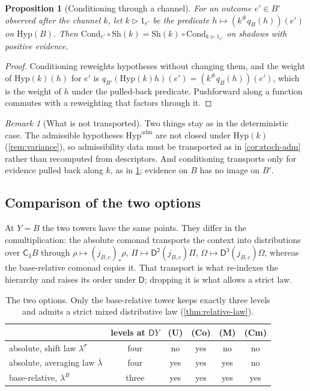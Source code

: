 \documentclass[11pt]{article}
\newtheorem{proposition}[theorem]{Proposition}
\theoremstyle{definition}
\theoremstyle{remark}
\newtheorem{remark}[theorem]{Remark}
\newcommand{\D}{\mathsf{D}}
\newcommand{\Hyp}{\mathrm{Hyp}}
\newcommand{\Sh}{\mathrm{Sh}}
\newcommand{\Cond}{\mathrm{Cond}}
\newcommand{\C}{\mathsf{C}}
\newcommand{\lb}{\bar\lambda}
\newcommand{\ls}{\lambda^{\sigma}}
\begin{document}
\begin{proposition}[Conditioning through a channel]\label{prop:stoch-cond}
For an outcome $e'\in B'$ observed after the channel $k$, let $k\rhd1_{e'}$ be the predicate
$h\mapsto (k^\#q_B(h))(e')$ on $\Hyp(B)$. Then
$\Cond_{e'}\circ\Sh(k)=\Sh(k)\circ\Cond_{k\rhd1_{e'}}$ on shadows with positive evidence.
\end{proposition}
\begin{proof}
Conditioning reweights hypotheses without changing them, and the weight of $\Hyp(k)(h)$ for $e'$ is
$q_{B'}(\Hyp(k)h)(e')=(k^\#q_B(h))(e')$, which is the weight of $h$ under the pulled-back predicate.
Pushforward along a function commutes with a reweighting that factors through it.
\end{proof}

\begin{remark}[What is not transported]
Two things stay as in the deterministic case. The admissible hypotheses $\Hyp^{\mathrm{adm}}$ are not
closed under $\Hyp(k)$ (\cref{rem:variance}), so admissibility data must be transported as in
\cref{cor:stoch-adm} rather than recomputed from descriptors. And conditioning transports only for
evidence pulled back along $k$, as in \cref{prop:stoch-cond}; evidence on $B$ has no image on $B'$.
\end{remark}

\subsection{Comparison of the two options}

At $Y=B$ the two towers have the same points. They differ in the comultiplication: the absolute
comonad transports the context into distributions over $\C_3B$ through
$\rho\mapsto(j_{B,c})_*\rho$, $\Pi\mapsto\D^2(j_{B,c})\Pi$, $\Omega\mapsto\D^3(j_{B,c})\Omega$, whereas the
base-relative comonad copies it. That transport is what re-indexes the hierarchy and raises its order
under $\D$; dropping it is what allows a strict law.

\begin{table}[h]
\centering
\begin{tabular}{@{}lccccc@{}}
\toprule
& levels at $\D Y$ & (U) & (Co) & (M) & (Cm)\\
\midrule
absolute, shift law $\ls$ & four & no & yes & no & no\\
absolute, averaging law $\lb$ & four & yes & yes & yes & no\\
base-relative, $\lambda^B$ & three & yes & yes & yes & yes\\
\bottomrule
\end{tabular}
\caption{The two options. Only the base-relative tower keeps exactly three levels and admits a
strict mixed distributive law (\cref{thm:relative-law}).}
\label{tab:options}
\end{table}
\end{document}
